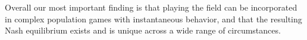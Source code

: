 Overall our most important finding is that playing the field can be incorporated in complex population games with instantaneous behavior, and that the resulting Nash equilibrium exists and is unique across a wide range of circumstances.











